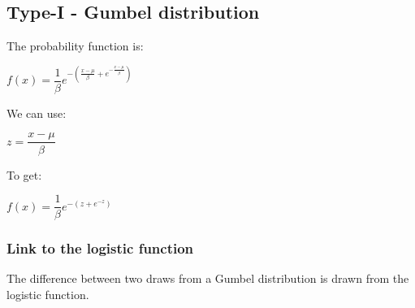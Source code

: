 
\subsection{Type-I - Gumbel distribution}

The probability function is:

\(f(x)=\dfrac{1}{\beta }e^{-(\frac{x-\mu}{\beta }+e^{-\frac{x-\mu }{\beta }})}\)

We can use:

\(z=\dfrac{x-\mu }{\beta }\)

To get:

\(f(x)=\dfrac{1}{\beta }e^{-(z+e^{-z})}\)

\subsubsection{Link to the logistic function}

The difference between two draws from a Gumbel distribution is drawn from the logistic function.

